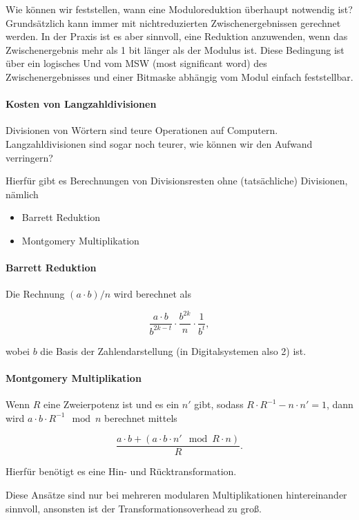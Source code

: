 Wie können wir feststellen, wann eine Moduloreduktion überhaupt notwendig ist? Grundsätzlich kann immer mit nichtreduzierten Zwischenergebnissen gerechnet werden. In der 
Praxis ist es aber sinnvoll, eine Reduktion anzuwenden, wenn das Zwischenergebnis mehr als 1 bit länger als der Modulus ist. Diese Bedingung ist über ein logisches Und 
vom MSW (most significant word) des Zwischenergebnisses und einer Bitmaske abhängig vom Modul einfach feststellbar.

\paragraph{Kosten von Langzahldivisionen}

Divisionen von Wörtern sind teure Operationen auf Computern. Langzahldivisionen sind sogar noch teurer, wie können wir den Aufwand verringern?  

Hierfür gibt es Berechnungen von Divisionsresten ohne (tatsächliche) Divisionen, nämlich 

\begin{itemize}
    \item Barrett Reduktion 
    \item Montgomery Multiplikation
\end{itemize}

\paragraph{Barrett Reduktion} 

Die Rechnung $(a\cdot b) / n$ wird berechnet als 

$$\frac{a\cdot b}{b^{2k-t}} \cdot \frac{b^{2k}}{n} \cdot \frac{1}{b^t},$$

wobei $b$ die Basis der Zahlendarstellung (in Digitalsystemen also 2) ist.

\paragraph{Montgomery Multiplikation}

Wenn $R$ eine Zweierpotenz ist und es ein $n'$ gibt, sodass $R \cdot R^{-1} - n\cdot n' = 1$, dann wird $a \cdot b \cdot R^{-1} \mod n$ berechnet mittels 

$$\frac{a\cdot b + (a \cdot b \cdot n'\mod R \cdot n)}{R}.$$

Hierfür benötigt es eine Hin- und Rücktransformation.

Diese Ansätze sind nur bei mehreren modularen Multiplikationen hintereinander sinnvoll, ansonsten ist der Transformationsoverhead zu groß.

